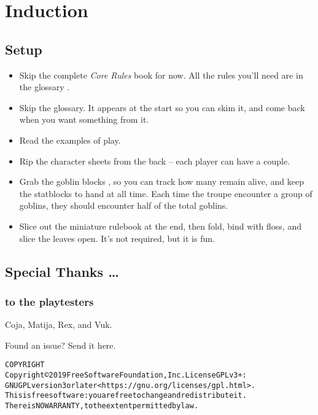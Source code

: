 \section*{Induction}

\begin{multicols}{2}
\subsection*{Setup}

\begin{itemize}
  \item
  Skip the complete \textit{Core Rules} book for now.
  All the rules you'll need are in the glossary .
  \item
  Skip the glossary.
  It appears at the start so you can skim it, and come back when you want something from it.
  \item
  Read the examples of play.
  \item
  Rip the character sheets from the back -- each player can have a couple.
  \item
  Grab the goblin blocks , so you can track how many remain alive, and keep the \glspl{statblock} to hand at all time.
  Each time the troupe encounter a group of goblins, they should encounter half of the total goblins.
  \item
  Slice out the miniature rulebook at the end, then fold, bind with floss, and slice the leaves open.
  It's not required, but it is fun.
\end{itemize}

\columnbreak

\subsection*{Special Thanks \ldots}
\subsubsection*{to the playtesters}
Coja, Matija, Rex, and Vuk.

\begin{center}
  
  Found an issue?
  Send it here.
\end{center}

\end{multicols}

\begin{alltt}
COPYRIGHT
       Copyright \copyright 2019 Free Software Foundation, Inc.  License GPLv3+:
  GNU GPL version 3 or later <https://gnu.org/licenses/gpl.html>.
       This is free software: you are free to change and redistribute it.
  There is NO WARRANTY, to the extent permitted by law.

\end{alltt}

